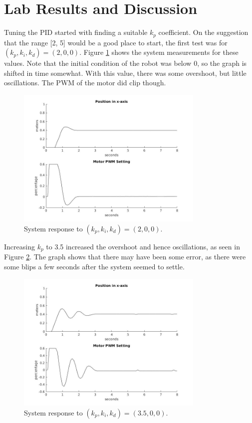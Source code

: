 \documentclass{journal}
\begin{document}
\section*{Lab Results and Discussion}
Tuning the PID started with finding a suitable $k_p$ coefficient.  On the suggestion that the range [2, 5] would be a good place to start, the first test was for $(k_p, k_i, k_d) = (2, 0, 0)$.  Figure \ref{fig:Lab1_p2i0d0} shows the system measurements for these values.  Note that the initial condition of the robot was below 0, so the graph is shifted in time somewhat.  With this value, there was some overshoot, but little oscillations.  The PWM of the motor did clip though.

\begin{figure}[H]
	\centering
	\includegraphics[width = 0.8\textwidth]{NickPhamgraphs/p2i0d0.jpg}
	\caption{System response to $(k_p, k_i, k_d) = (2, 0, 0)$.}
	\label{fig:Lab1_p2i0d0}
\end{figure}

Increasing $k_p$ to 3.5 increased the overshoot and hence oscillations, as seen in Figure \ref{fig:Lab1_p3_5i0d0}.  The graph shows that there may have been some error, as there were some blips a few seconds after the system seemed to settle.

\begin{figure}[H]
	\centering
	\includegraphics[width = 0.8\textwidth]{NickPhamgraphs/p3_5i0d0.jpg}
	\caption{System response to $(k_p, k_i, k_d) = (3.5, 0, 0)$.}
	\label{fig:Lab1_p3_5i0d0}
\end{figure}
\end{document}
